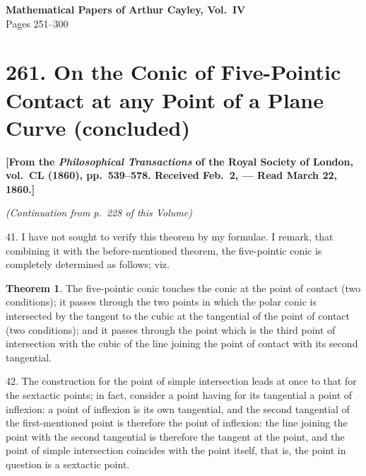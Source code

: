 \documentclass[11pt,a4paper]{article}
\theoremstyle{definition}
\newtheorem{theorem}{Theorem}
\begin{document}
\begin{center}
\Large\textbf{Mathematical Papers of Arthur Cayley, Vol.~IV}\\[6pt]
\large Pages 251--300
\end{center}

\tableofcontents
\newpage

\section[261. On the Conic of Five-Pointic Contact]{261. On the Conic of Five-Pointic Contact at any Point of a Plane Curve (concluded)}

\textbf{[From the \textit{Philosophical Transactions} of the Royal Society of London, vol.~CL (1860), pp.~539--578. Received Feb.~2, --- Read March 22, 1860.]}

\vspace{6pt}

\noindent\textit{(Continuation from p.~228 of this Volume)}

\vspace{6pt}

41. I have not sought to verify this theorem by my formulae. I remark, that combining it with the before-mentioned theorem, the five-pointic conic is completely determined as follows; viz.

\begin{theorem}
The five-pointic conic touches the conic at the point of contact (two conditions); it passes through the two points in which the polar conic is intersected by the tangent to the cubic at the tangential of the point of contact (two conditions); and it passes through the point which is the third point of intersection with the cubic of the line joining the point of contact with its second tangential.
\end{theorem}

42. The construction for the point of simple intersection leads at once to that for the sextactic points; in fact, consider a point having for its tangential a point of inflexion: a point of inflexion is its own tangential, and the second tangential of the first-mentioned point is therefore the point of inflexion: the line joining the point with the second tangential is therefore the tangent at the point, and the point of simple intersection coincides with the point itself, that is, the point in question is a sextactic point.
\end{document}
